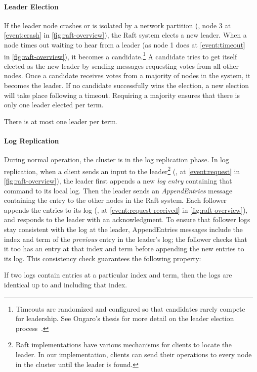 \paragraph*{Leader Election}
If the leader node crashes or is isolated by a network
partition (\eg, node 3 at \cref{event:crash} in \cref{fig:raft-overview}),
the Raft system elects a new leader.
When a node times out waiting to hear from a leader
(as node 1 does at \cref{event:timeout} in \cref{fig:raft-overview}),
it becomes a candidate.\footnote{Timeouts are randomized and configured so that candidates rarely compete for leadership. See Ongaro's thesis for more detail on the leader election process~\cite{ongaro:phd}.}
A candidate tries to get itself elected as the new leader
by sending messages requesting votes from all other nodes.
Once a candidate receives votes from a majority of nodes in the system,
it becomes the leader.
If no candidate successfully wins the election,
a new election will take place following a timeout.
Requiring a majority ensures that there is only one leader elected per term.
\begin{proposition}
  There is at most one leader per term.
\end{proposition}

\paragraph*{Log Replication}
During normal operation,
  the cluster is in the log replication phase.
In log replication,
  when a client sends an input to
  the leader\footnote{Raft implementations have various mechanisms
    for clients to locate the leader. In our implementation, clients
    can send their operations to every node in the cluster until the
    leader is found.}
  (\eg, at \cref{event:request} in \cref{fig:raft-overview}),
  the leader first appends a new \emph{log entry}
  containing that command to its local log.
Then the leader sends an \emph{AppendEntries} message
  containing the entry to the other nodes in the Raft system.
Each follower appends the entries to its log
  (\eg, at \cref{event:request-received} in \cref{fig:raft-overview}),
  and responds to the leader with an acknowledgment.
To ensure that follower logs stay consistent
  with the log at the leader,
  AppendEntries messages include the index and term
  of the \textit{previous} entry in the leader's log;
  the follower checks that
  it too has an entry at that index and term
  before appending the new entries to its log.
This consistency check guarantees the following property:
\begin{proposition}
  If two logs contain entries at a particular index and term,
  then the logs are identical up to and including that index.
\end{proposition}


